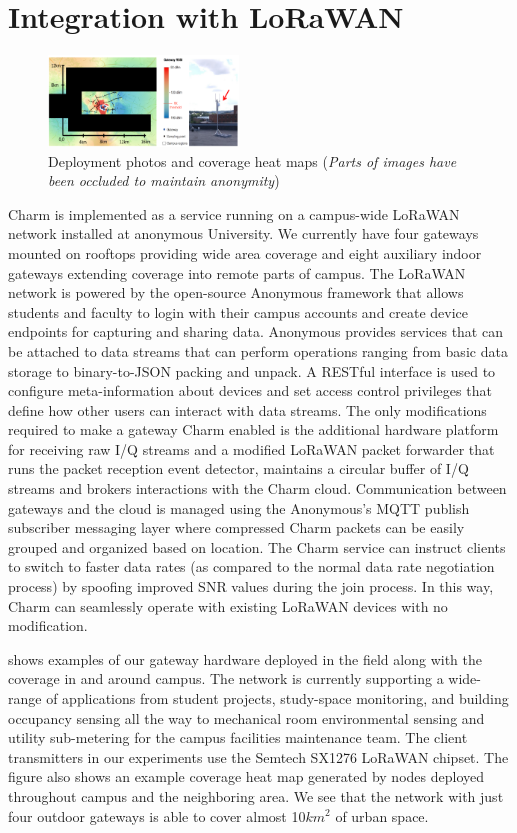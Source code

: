 \section{Integration with LoRaWAN}
\label{sec:implementation}

\begin{figure}
    \centering
    \includegraphics[width=0.45\textwidth]{figures/deployment.pdf}
    \caption{Deployment photos and coverage heat maps (\textit{Parts of images have been occluded to maintain anonymity})}
    \label{fig:deployment}
\end{figure}

Charm is implemented as a service running on a campus-wide LoRaWAN network installed at anonymous University.  We currently have four gateways mounted on rooftops providing wide area coverage and eight auxiliary indoor gateways extending coverage into remote parts of campus. The LoRaWAN network is powered by the open-source Anonymous framework that allows students and faculty to login with their campus accounts and create device endpoints for capturing and sharing data.  Anonymous provides services that can be attached to data streams that can perform operations ranging from basic data storage to binary-to-JSON packing and unpack. A RESTful interface is used to configure meta-information about devices and set access control privileges that define how other users can interact with data streams.  The only modifications required to make a gateway Charm enabled is the additional hardware platform for receiving raw I/Q streams and a modified LoRaWAN packet forwarder that runs the packet reception event detector, maintains a circular buffer of I/Q streams and brokers interactions with the Charm cloud.  Communication between gateways and the cloud is managed using the Anonymous's MQTT publish subscriber messaging layer where compressed Charm packets can be easily grouped and organized based on location.  The Charm service can instruct clients to switch to faster data rates (as compared to the normal data rate negotiation process) by spoofing improved SNR values during the join process. In this way, Charm can seamlessly operate with existing LoRaWAN devices with no modification.

 shows examples of our gateway hardware deployed in the field along with the coverage in and around campus.  The network is currently supporting a wide-range of applications from student projects, study-space monitoring, and building occupancy sensing all the way to mechanical room environmental sensing and utility sub-metering for the campus facilities maintenance team.  The client transmitters in our experiments use the Semtech SX1276 LoRaWAN chipset. The figure also shows an example coverage heat map generated by nodes deployed throughout campus and the neighboring area.  We see that the network with just four outdoor gateways is able to cover almost 10$km^2$ of urban space.

